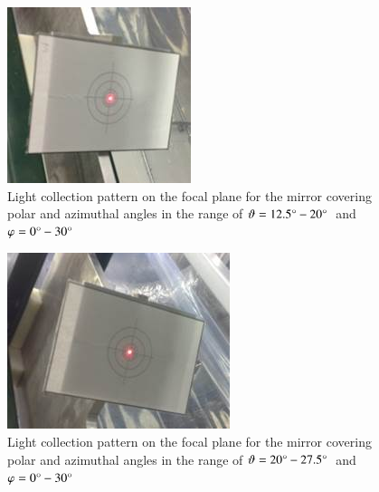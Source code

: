\begin{figure}[h]
    \centering
    \includegraphics[width=0.90\linewidth]{images/Focal_Plane_3.jpg}
    \caption{Light collection pattern on the focal plane for the mirror covering polar and azimuthal angles in the range of $\vartheta = 12.5\degree - 20\degree$\, and\, $\varphi = 0\degree - 30\degree$}
    \label{fig:Focal_Plane_3}
\end{figure}

\begin{figure}[h]
    \centering
    \includegraphics[width=0.94\linewidth]{images/Focal_Plane_2.jpg}
    \caption{Light collection pattern on the focal plane for the mirror covering polar and azimuthal angles in the range of $\vartheta = 20\degree - 27.5\degree$\, and\, $\varphi = 0\degree - 30\degree$}
    \label{fig:Focal_Plane_2}
\end{figure}

